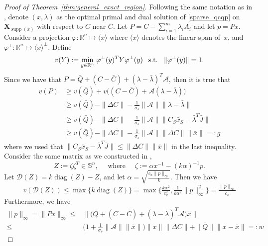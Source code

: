 \documentclass[11pt]{amsart}
\theoremstyle{plain}
\theoremstyle{definition}
\theoremstyle{remark}
\newcommand{\vX}{{\mathbf{X}}}
\newcommand{\cA}{{\mathcal{A}}}
\newcommand{\cD}{{\mathcal{D}}}
\newcommand{\RR}{\mathbb{R}}
\renewcommand{\SS}{{\mathbb{S}}}
\newcommand{\st}{\text{\, s.t.\, }}
\DeclareMathOperator{\diag}{diag}
\DeclareMathOperator{\supp}{supp}
\begin{document}
	\begin{proof}[Proof of Theorem~\ref{thm:general_exact_region}]
		Following the same notation as in , denote $(x, \lambda)$ as the optimal primal and dual solution of \eqref{sparse_qcqp} on \(\vX_{\supp (\bar x)}\) with respect to  \(C\) near \(\bar C\). Let $P = C - \sum_{i=1}^m\lambda_iA_i$
		and let $ p =  P x$.
		Consider a projection $\varphi: \RR^n \mapsto \langle  x\rangle$ where $\langle x\rangle$ denotes the linear span of~$x$, and $\varphi^\perp: \RR^n \mapsto \langle x\rangle^\perp$.
		Define 
		\[v(Y) := \underset{y \in \RR^n}{\min} \;\varphi^\perp(y)^T Y \varphi^\perp(y) \;\st\; \|\varphi^\perp(y)\|=1 .
		\]
		Since we have that $P = \bar Q + (C - \bar C) + (\lambda - \bar \lambda)^T \cA$, then it is true that
		\begin{equation}\label{eq:exact_region_ineq1}
			\begin{split}
				v(P) &\geq v(\bar Q) + v\big(( C - \bar C) + \cA(\lambda - \bar \lambda)\big)\\
				&\geq v(\bar Q) - \|\Delta C\| - \frac{1}{\sigma_s}\|\cA\|\|\lambda - \bar\lambda\|\\
				&\geq v(\bar Q) - \|\Delta C\| - \frac{1}{\sigma_s}\|\cA\|\| C_S\bar x_S - \bar\lambda^T\bar J\| \\
				&\geq v(\bar Q) - \|\Delta C\| - \frac{1}{\sigma_s}\|\cA\|\| \Delta C\|\|\bar x \|=:  g
			\end{split}
		\end{equation}
		where we used that \(\| C_S\bar x_S - \bar\lambda^T\bar J\|\leq \|\Delta C\|\|\bar x \|\) in the last inequality.
		Consider the same matrix as we constructed in ,
		\begin{equation}
			Z := \zeta\zeta^T \in \SS^n,
			\quad\text{ where }\quad
			\zeta := \alpha x^{-1}  - (k\alpha)^{-1} p.
		\end{equation}
		Let $\cD(Z) = k\diag(Z) - Z$, and let $\alpha = \sqrt{\frac{c_{ x} \|p\|_\infty}{k}}$.
		Then we have
		\begin{equation}\label{eq:exact_region_ineq2}
			v(\cD (Z)) \leq \max\{k\diag(Z)\} = \max\{\tfrac{k\alpha^2}{c^2_{x}}, \tfrac{1}{k\alpha^2} \| p\|^2_\infty\} = \tfrac{\|p\|_\infty}{c_x}
		\end{equation}
		Furthermore, we have
		\begin{equation}\label{eq:exact_region_ineq3}
			\begin{split}
				\| p\|_\infty =  \|P x\|_\infty
				\leq & \Big\|\big(\bar Q + (C - \bar C) + (\lambda - \bar\lambda)^T \cA\big)x\Big\|\\
				\leq & \big(1 +\frac{1}{\sigma_s}\|\cA\|\|\bar x\|\big)\| x\|\|\Delta C\|
				+\|\bar Q\|\| x- \bar x\| =:  w
			\end{split}
		\end{equation}
        

\end{proof}
\end{document}
